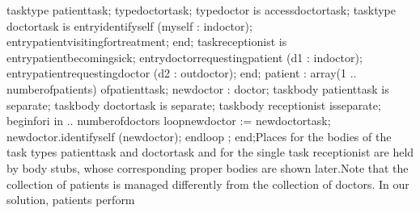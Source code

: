    \tyxtstxbf[]task\tyxtstxendbf[] \tyxtstxbf[]type%
\tyxtstxendbf[] patient\Symuns[]task;
   \tyxtstxbf[]type\tyxtstxendbf[] doctor\Symuns[]task;
   \tyxtstxbf[]type\tyxtstxendbf[] doctor \tyxtstxbf[]is%
\tyxtstxendbf[] \tyxtstxbf[]access\tyxtstxendbf[] doctor\Symuns[]task;
   \tyxtstxbf[]task\tyxtstxendbf[] \tyxtstxbf[]type%
\tyxtstxendbf[] doctor\Symuns[]task \tyxtstxbf[]is%
\tyxtstxendbf[]
      \tyxtstxbf[]entry\tyxtstxendbf[] identify\Symuns[]self (myself : %
\tyxtstxbf[]in\tyxtstxendbf[] doctor);
      \tyxtstxbf[]entry\tyxtstxendbf[] patient\Symuns[]visiting\Symuns[]for\Symuns[]treatment;
   \tyxtstxbf[]end\tyxtstxendbf[];
   \tyxtstxbf[]task\tyxtstxendbf[] receptionist \tyxtstxbf[]is%
\tyxtstxendbf[]
      \tyxtstxbf[]entry\tyxtstxendbf[] patient\Symuns[]becoming\Symuns[]sick;
      \tyxtstxbf[]entry\tyxtstxendbf[] doctor\Symuns[]requesting\Symuns[]patient (d1 : %
\tyxtstxbf[]in\tyxtstxendbf[]  doctor);
      \tyxtstxbf[]entry\tyxtstxendbf[] patient\Symuns[]requesting\Symuns[]doctor (d2 : %
\tyxtstxbf[]out\tyxtstxendbf[] doctor);
   \tyxtstxbf[]end\tyxtstxendbf[];
   patient    : \tyxtstxbf[]array\tyxtstxendbf[] (1 .. number\Symuns[]of\Symuns[]patients) %
\tyxtstxbf[]of\tyxtstxendbf[] patient\Symuns[]task;
   new\Symuns[]doctor : doctor;
   \tyxtstxbf[]task\tyxtstxendbf[] \tyxtstxbf[]body%
\tyxtstxendbf[] patient\Symuns[]task \tyxtstxbf[]is%
\tyxtstxendbf[] \tyxtstxbf[]separate\tyxtstxendbf[];
   \tyxtstxbf[]task\tyxtstxendbf[] \tyxtstxbf[]body%
\tyxtstxendbf[] doctor\Symuns[]task  \tyxtstxbf[]is%
\tyxtstxendbf[] \tyxtstxbf[]separate\tyxtstxendbf[];
   \tyxtstxbf[]task\tyxtstxendbf[] \tyxtstxbf[]body%
\tyxtstxendbf[] receptionist \tyxtstxbf[]is\tyxtstxendbf[] %
\tyxtstxbf[]separate\tyxtstxendbf[];
\tyxtstxbf[]begin\tyxtstxendbf[]
   \tyxtstxbf[]for\tyxtstxendbf[] i \tyxtstxbf[]in%
 .. number\Symuns[]of\Symuns[]doctors %
\tyxtstxbf[]loop\tyxtstxendbf[]
      new\Symuns[]doctor := \tyxtstxbf[]new\tyxtstxendbf[] doctor\Symuns[]task;
      new\Symuns[]doctor.identify\Symuns[]self (new\Symuns[]doctor);
   \tyxtstxbf[]end\tyxtstxendbf[] \tyxtstxbf[]loop%
\tyxtstxendbf[];
\tyxtstxbf[]end\tyxtstxendbf[];\Endcomp[]
\EndParbox[]
\FgEndblock[]
 Places for the bodies of the task types \tyxffmxmono[]patient\Symuns[]task%
\tyxffmxendmono[] and \tyxffmxmono[]doctor\Symuns[]task%
\tyxffmxendmono[] and for the single task \tyxffmxmono[]receptionist%
\tyxffmxendmono[] are held by body stubs, whose corresponding proper
bodies are shown later.\Endpara[]
\Para[]Note that the collection of patients is managed differently
from the collection of doctors. In our solution, patients perform
